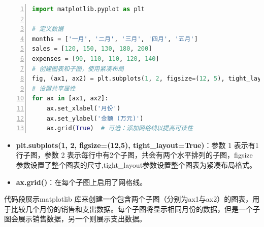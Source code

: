 \begin{lstlisting}[language={python},label={Matplotlib简单操作1},caption={Matplotlib简单操作1}, basicstyle=\footnotesize\ttfamily, breaklines=true, numbers=left, frame=single]
import matplotlib.pyplot as plt

# 定义数据
months = ['一月', '二月', '三月', '四月', '五月']
sales = [120, 150, 130, 180, 200]
expenses = [90, 110, 110, 120, 140]
# 创建图表和子图，使用紧凑布局
fig, (ax1, ax2) = plt.subplots(1, 2, figsize=(12, 5), tight_layout=True)
# 设置共享属性
for ax in [ax1, ax2]:
    ax.set_xlabel('月份')
    ax.set_ylabel('金额 (万元)')
    ax.grid(True)  # 可选：添加网格线以提高可读性
\end{lstlisting}

\begin{itemize}
    \item \textbf{plt.subplots(1, 2, figsize=(12,5), tight\_layout=True)}：参数 1 表示有1行子图，参数 2 表示每行中有2个子图，共会有两个水平排列的子图，figsize 参数设置了整个图表的尺寸,tight\_layout参数设置整个图表为紧凑布局格式。
    \item \textbf{ax.grid()}：在每个子图上启用了网格线。
\end{itemize}

代码段展示matplotlib 库来创建一个包含两个子图（分别为ax1与ax2）的图表，用于比较几个月份的销售和支出数据。每个子图将显示相同月份的数据，但是一个子图会展示销售数据，另一个则展示支出数据。

